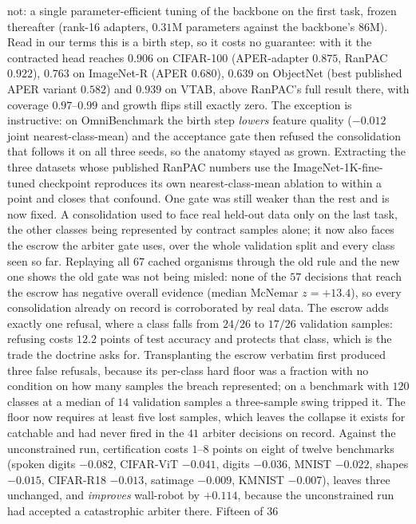 \documentclass{article}
\begin{document}
not: a single parameter-efficient tuning of the backbone on the first task,
frozen thereafter (rank-16 adapters, $0.31$M parameters against the backbone's
$86$M). Read in our terms this is a birth step, so it costs no guarantee: with
it the contracted head reaches $0.906$ on CIFAR-100 (APER-adapter $0.875$, RanPAC $0.922$), $0.763$ on ImageNet-R (APER $0.680$), $0.639$ on ObjectNet (best published APER variant $0.582$) and $0.939$ on VTAB, above RanPAC's full result there, with coverage $0.97$--$0.99$ and growth flips still exactly
zero. The exception is instructive: on OmniBenchmark the birth step \emph{lowers}
feature quality ($-0.012$ joint nearest-class-mean) and the acceptance gate then
refused the consolidation that follows it on all three seeds, so the anatomy
stayed as grown. Extracting the three datasets whose published RanPAC numbers
use the ImageNet-1K-fine-tuned checkpoint reproduces its own nearest-class-mean
ablation to within a point and closes that confound. One gate was still weaker than the rest and is now fixed. A
consolidation used to face real held-out data only on the last task, the other
classes being represented by contract samples alone; it now also faces the
escrow the arbiter gate uses, over the whole validation split and every class
seen so far. Replaying all $67$ cached organisms through the old rule and the new one shows the old gate was not being misled: none of the $57$ decisions that reach the escrow has negative overall evidence (median McNemar $z = +13.4$), so every consolidation already on record is corroborated by real data. The escrow adds exactly one refusal, where a
class falls from $24/26$ to $17/26$ validation samples: refusing costs $12.2$
points of test accuracy and protects that class, which is the trade the doctrine
asks for. Transplanting the escrow verbatim first produced three false
refusals, because its per-class hard floor was a fraction with no condition on
how many samples the breach represented; on a benchmark with $120$ classes at a
median of $14$ validation samples a three-sample swing tripped it. The floor now
requires at least five lost samples, which leaves the collapse it exists for
catchable and had never fired in the $41$ arbiter decisions on record. Against the unconstrained run, certification costs
$1$--$8$ points on eight of twelve benchmarks (spoken digits $-0.082$,
CIFAR-ViT $-0.041$, digits $-0.036$, MNIST $-0.022$, shapes $-0.015$,
CIFAR-R18 $-0.013$, satimage $-0.009$, KMNIST $-0.007$), leaves three
unchanged, and \emph{improves} wall-robot by $+0.114$, because the
unconstrained run had accepted a catastrophic arbiter there. Fifteen of $36$
\end{document}
